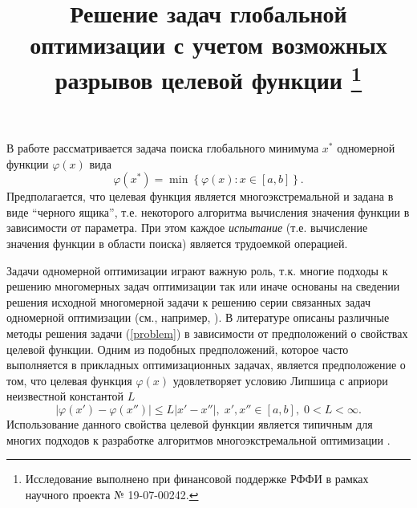 \documentclass[11pt, oneside, a4paper]{article}
\begin{document}
\setcounter{page}{1}



\title{
Решение задач глобальной оптимизации с учетом возможных разрывов целевой функции
\footnote{Исследование выполнено при финансовой поддержке РФФИ в рамках научного проекта № 19-07-00242.}
}





\bigskip

В работе рассматривается задача поиска глобального минимума $x^*$ одномерной функции $\varphi(x)$ вида
\begin{equation}\label{problem}
\varphi(x^*)=\min\left\{\varphi(x):x\in\left[a,b\right]\right\}.
\end{equation}
Предполагается, что целевая функция является многоэкстремальной и задана в виде ``черного ящика'', т.е. некоторого алгоритма вычисления значения функции в зависимости от параметра. При этом каждое \textit{испытание} (т.е. вычисление значения функции в области поиска) является трудоемкой операцией.  

Задачи одномерной оптимизации играют важную роль, т.к. многие подходы к решению многомерных задач оптимизации так или иначе основаны на сведении решения исходной многомерной задачи к решению серии связанных задач одномерной оптимизации (см., например, \cite{Grishagin2007,Sergeyev2008}).
В литературе описаны различные методы решения задачи (\ref{problem}) в зависимости от предположений о свойствах целевой функции. Одним из подобных предположений, которое часто выполняется в прикладных оптимизационных задачах, является предположение о том, что целевая функция $\varphi(x)$ удовлетворяет условию Липшица с априори неизвестной константой $L$
\[
\left|\varphi(x')-\varphi(x'')\right|\leq L\left|x'-x''\right|,\; x',x'' \in [a,b],\; 0<L<\infty.
\]
Использование данного свойства целевой функции является типичным для многих подходов к разработке алгоритмов многоэкстремальной оптимизации \cite{Evtushenko2009,Elsakov}. 
\end{document}
